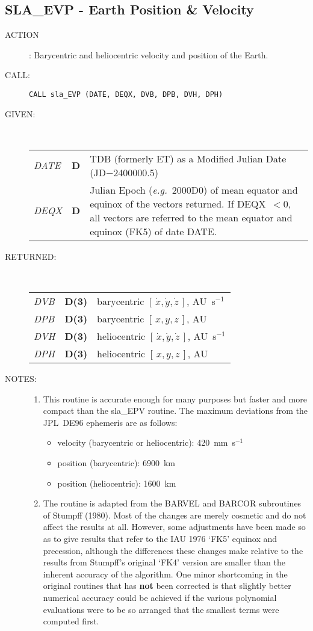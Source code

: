 \documentclass[11pt,twoside]{article}
\newcommand{\xlabel}[1]{}
\newcommand{\xyz}       {$[\,x,y,z\,]$}
\newcommand{\xyzd}      {$[\,\dot{x},\dot{y},\dot{z}\,]$}
\newcommand{\routine}[3]
{\hbadness=10000
  \vbox
  {
    \rule{\textwidth}{0.3mm}\\
    {\Large {\bf #1} \hfill #2 \hfill {\bf #1}}\\
    \setlength{\oldspacing}{\topsep}
    \setlength{\topsep}{0.3ex}
    \begin{description}
      #3
    \end{description}
    \setlength{\topsep}{\oldspacing}
  }
}
\renewcommand{\routine}[3]
   {
      \subsection{#1\xlabel{#1} - #2\label{#1}}
       \begin{description}
         #3
       \end{description}
   }
\newcommand{\action}[1]
{\item[ACTION]: #1}
\newcommand{\action}[1]
   {\item[ACTION:] #1}
\newcommand{\call}[1]
{\item[CALL]: \hspace{0.4em}{\tt #1}}
\newlength{\oldspacing}
\renewcommand{\call}[1]
   {
    \item[CALL:] {\tt #1}
   }
\newcommand{\args}[2]
{
  \goodbreak
  \setlength{\oldspacing}{\topsep}
  \setlength{\topsep}{0.3ex}
  \begin{description}
  \item[#1]:\\[1.5ex]
    \begin{tabular}{p{7em}p{6em}p{22em}}
      #2
    \end{tabular}
  \end{description}
  \setlength{\topsep}{\oldspacing}
}
\renewcommand{\args}[2]
   {
     \begin{description}
        \item[#1:]\\
        \begin{tabular}{p{7em}p{6em}l}
           #2
        \end{tabular}
     \end{description}
   }
\newcommand{\spec}[3]
{
  {\em {#1}} & {\bf \mbox{#2}} & {#3}
}
\newcommand{\notes}[1]
{
  \goodbreak
  \setlength{\oldspacing}{\topsep}
  \setlength{\topsep}{0.3ex}
  \begin{description}
    \item[NOTES]:
        #1
  \end{description}
  \setlength{\topsep}{\oldspacing}
}
\renewcommand{\notes}[1]
   {
      \begin{description}
         \item[NOTES:]
            #1
      \end{description}
   }
\begin{document}
\routine{SLA\_EVP}{Earth Position \& Velocity}
{
 \action{Barycentric and heliocentric velocity and position of the Earth.}
 \call{CALL sla\_EVP (DATE, DEQX, DVB, DPB, DVH, DPH)}
}
\args{GIVEN}
{
 \spec{DATE}{D}{TDB (formerly ET) as a Modified Julian Date
                                        (JD$-$2400000.5)} \\
 \spec{DEQX}{D}{Julian Epoch ({\it e.g.}\ 2000D0) of mean equator and
                equinox of the vectors returned.  If DEQX~$<0$,
                  all vectors are referred to the mean equator and
                  equinox (FK5) of date DATE.}
}
\args{RETURNED}
{
 \spec{DVB}{D(3)}{barycentric \xyzd, AU~s$^{-1}$} \\
 \spec{DPB}{D(3)}{barycentric \xyz, AU} \\
 \spec{DVH}{D(3)}{heliocentric \xyzd, AU~s$^{-1}$} \\
 \spec{DPH}{D(3)}{heliocentric \xyz, AU}
}
\notes
{
 \begin{enumerate}
  \item This routine is accurate enough for many purposes but faster
        and more compact than the sla\_EPV routine.  The maximum
        deviations from the JPL~DE96 ephemeris are as follows:
        \begin{itemize}
         \item velocity (barycentric or heliocentric): 420~mm~s$^{-1}$
         \item position (barycentric): 6900~km
         \item position (heliocentric): 1600~km
        \end{itemize}
  \item The routine is adapted from the BARVEL and BARCOR
        subroutines of Stumpff (1980).
        Most of the changes are merely cosmetic and do not affect
        the results at all.  However, some adjustments have been
        made so as to give results that refer to the IAU 1976
        `FK5' equinox and precession, although the differences these
        changes make relative to the results from Stumpff's original
        `FK4' version are smaller than the inherent accuracy of the
        algorithm.  One minor shortcoming in the original routines
        that has {\bf not} been corrected is that slightly better
        numerical accuracy could be achieved if the various polynomial
        evaluations were to be so arranged that the smallest terms were
        computed first.
 \end{enumerate}
}
\end{document}
